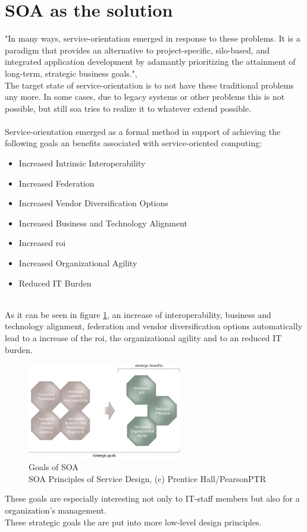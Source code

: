 \documentclass[12pt]{article}
\begin{document}
\section{SOA as the solution} 
"In many ways, service-orientation emerged in response to these problems. It is a paradigm that provides an alternative to project-specific, silo-based, and integrated application development by adamantly prioritizing the attainment of long-term, strategic business goals.",\cite[page 522]{grau} \\
The target state of service-orientation is to not have these traditional problems any more. In some cases, due to legacy systems or other problems this is not possible, but still \gls{soa} tries to realize it to whatever extend possible.
\\ \\
Service-orientation emerged as a formal method in support of achieving the following goals an benefits associated with service-oriented computing: \\
\begin{itemize}
\item Increased Intrinsic Interoperability
\item Increased Federation
\item Increased Vendor Diversification Options 
\item Increased Business and Technology Alignment
\item Increased \gls{roi}
\item Increased Organizational Agility
\item Reduced IT Burden
\end{itemize} \cite[page 23]{grau}\\
As it can be seen in figure \ref{fig:goalssoa}, an increase of interoperability,  business and technology alignment, federation and vendor diversification options automatically lead to a increase of the \gls{roi}, the organizational agility and to an reduced IT burden.
\begin{figure}[here!]
	\centering
	\includegraphics[width=0.6\textwidth]{images/page24}
	\caption{Goals of SOA\cite{photos}\\ SOA Principles of Service Design, (c) Prentice Hall/PearsonPTR}
	\label{fig:goalssoa}
	\end{figure}
\FloatBarrier
 \noindent
These goals are especially interesting not only to IT-staff members but also for a organization's management. \\
These strategic goals the are put into more low-level design principles.
\end{document}
